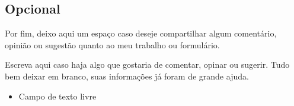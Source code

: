 \begin{apendicesenv}
  \section*{Opcional}

  Por fim, deixo aqui um espaço caso deseje compartilhar algum comentário, opinião ou sugestão quanto ao meu trabalho ou formulário.

  Escreva aqui caso haja algo que gostaria de comentar, opinar ou sugerir. Tudo bem deixar em branco, suas informações já foram de grande ajuda.

  \begin{itemize}
    \item Campo de texto livre
  \end{itemize}

\end{apendicesenv}
